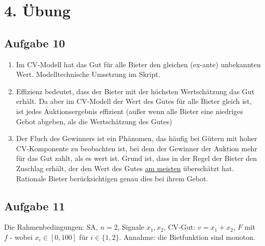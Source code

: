 \documentclass[12pt]{extreport} %
\theoremstyle{named}
\theoremstyle{itshape}
\theoremstyle{normal}
\begin{document}
\section*{4. Übung}

\subsection*{Aufgabe 10}

\begin{enumerate}[label=\alph*\upshape)]
	\item Im CV-Modell hat das Gut für alle Bieter den gleichen (ex-ante) unbekannten Wert. Modelltechnische Umsetzung im Skript.
	\item Effizienz bedeutet, dass der Bieter mit der höchsten Wertschätzung das Gut erhält. Da aber im CV-Modell der Wert des Gutes für alle Bieter gleich ist, ist jedes Auktionsergebnis effizient (außer wenn alle Bieter eine niedriges Gebot abgeben, als die Wertschätzung des Gutes)
	\item Der Fluch des Gewinners ist ein Phänomen, das häufig bei Gütern mit hoher CV-Komponente zu beobachten ist, bei dem der Gewinner der Auktion mehr für das Gut zahlt, als es wert ist. Grund ist, dass in der Regel der Bieter den Zuschlag erhält, der den Wert des Gutes \underline{am meisten} überschätzt hat. ~\\
		Rationale Bieter berücksichtigen genau dies bei ihrem Gebot.
\end{enumerate}

\subsection*{Aufgabe 11}

Die Rahmenbedingungen: SA, $n = 2$, Signale $x_1, x_2$, CV-Gut: $v = x_1 + x_2$, $F$ mit $f$ - wobei $x_{i} \in [0, 100]$ für $i \in \{1, 2 \}$. Annahme: die Bietfunktion sind monoton.
\end{document}
